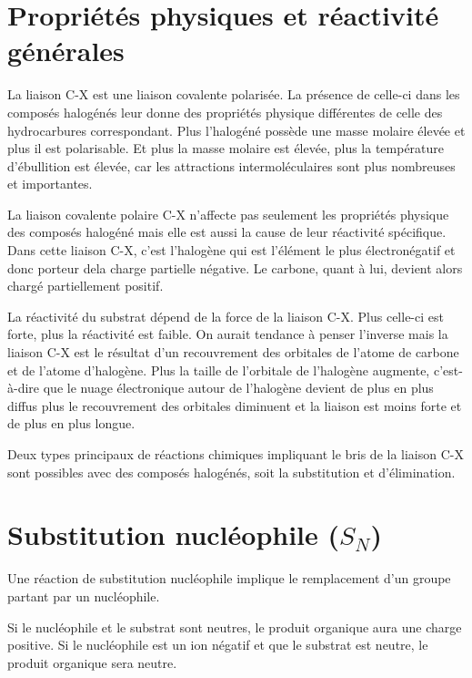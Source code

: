 \section{Propriétés physiques et réactivité générales}

La liaison C-X est une liaison covalente polarisée.
La présence de celle-ci dans les composés halogénés leur donne des propriétés physique différentes de celle des hydrocarbures correspondant.
Plus l'halogéné possède une masse molaire élevée et plus il est polarisable.
Et plus la masse molaire est élevée, plus la température d'ébullition est élevée, car les attractions intermoléculaires sont plus nombreuses et importantes.


La liaison covalente polaire C-X n'affecte pas seulement les propriétés physique des composés halogéné mais elle est aussi la cause de leur réactivité spécifique.
Dans cette liaison C-X, c'est l'halogène qui est l'élément le plus électronégatif et donc porteur dela charge partielle négative.
Le carbone, quant à lui, devient alors chargé partiellement positif.

La réactivité du substrat dépend de la force de la liaison C-X.
Plus celle-ci est forte, plus la réactivité est faible.
On aurait tendance à penser l'inverse mais la liaison C-X est le résultat d'un recouvrement des orbitales de l'atome de carbone et de l'atome d'halogène.
Plus la taille de l'orbitale de l'halogène augmente, c'est-à-dire que le nuage électronique autour de l'halogène devient de plus en plus diffus plus le recouvrement des orbitales diminuent et la liaison est moins forte et de plus en plus longue.


Deux types principaux de réactions chimiques impliquant le bris de la liaison C-X sont possibles avec des composés halogénés, soit la substitution et d'élimination.

\section{Substitution nucléophile ($S_N$)}

Une réaction de substitution nucléophile implique le remplacement d'un groupe partant par un nucléophile.

Si le nucléophile et le substrat sont neutres, le produit organique aura une charge positive.
Si le nucléophile est un ion négatif et que le substrat est neutre, le produit organique sera neutre.

